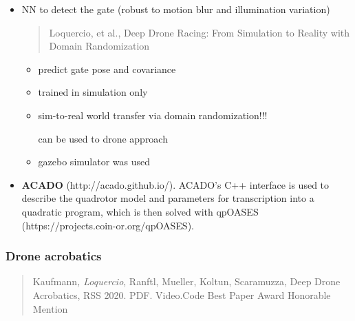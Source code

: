 \documentclass[]{article}
\begin{document}
\begin{itemize}
\item
  NN to detect the gate (robust to motion blur and illumination
  variation)

  \begin{quote}
  Loquercio, et al., Deep Drone Racing: From Simulation to Reality with
  Domain Randomization
  \end{quote}

  \begin{itemize}
  \item
    predict gate pose and covariance
  \item
    trained in simulation only
  \item
    sim-to-real world transfer via domain randomization!!!

    can be used to drone approach
  \item
    gazebo simulator was used
  \end{itemize}
\item
  \textbf{ACADO} (http://acado.github.io/). ACADO's C++ interface is
  used to describe the quadrotor model and parameters for transcription
  into a quadratic program, which is then solved with qpOASES
  (https://projects.coin-or.org/qpOASES).
\end{itemize}

\subsubsection{Drone acrobatics}\label{header-n2686}

\begin{quote}
Kaufmann\emph{, Loquercio}, Ranftl, Mueller, Koltun, Scaramuzza, Deep
Drone Acrobatics, RSS 2020. PDF. Video.Code Best Paper Award Honorable
Mention
\end{quote}
\end{document}
